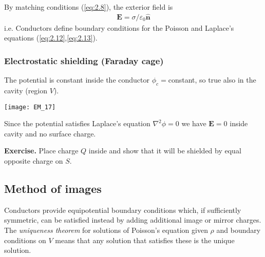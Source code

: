 \documentclass[a4paper]{article}
\begin{document}
By matching conditions (\eqref{eq:2.8}), the exterior field is
\begin{equation*}\tag{2.28} \label{eq:2.28}
\begin{aligned}
\mathbf{E} = \sigma/\varepsilon_0 \hat{\mathbf{n}}
\end{aligned}
\end{equation*}
i.e. Conductors define boundary conditions for the Poisson and Laplace's equations (\eqref{eq:2.12},\eqref{eq:2.13}).

\subsubsection{Electrostatic shielding (Faraday cage)}
The potential is constant inside the conductor $\phi_c=$constant, so true also in the cavity (region $V$).

\texttt{[image: EM\_17]}

Since the potential satisfies Laplace's equation $\nabla^2 \phi = 0$ we have $\mathbf{E} = 0$ inside cavity and no surface charge.

\textbf{Exercise.} Place charge $Q$ inside and show that it will be shielded by equal opposite charge on $S$.

\subsection{Method of images}
Conductors provide equipotential boundary conditions which, if sufficiently symmetric, can be satisfied instead by adding additional image or mirror charges. The \emph{uniqueness theorem} for solutions of Poisson's equation given $\rho$ and boundary conditions on $V$ means that any solution that satisfies these is the unique solution.
\end{document}
